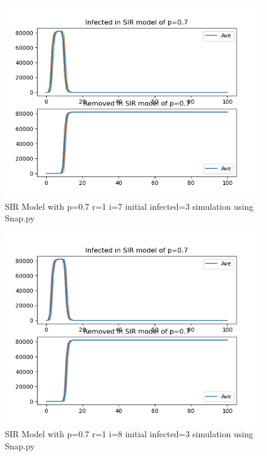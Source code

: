 \documentclass{subfile}
\begin{document}
  \begin{figure}
  \includegraphics[scale=0.8]{sirp07r1i7s3}
  \caption[SIR p=0.7,r=1,i=7,init infected=3]{SIR Model with p=0.7 r=1 i=7 initial infected=3 simulation using Snap.py}
  \end{figure}
  \begin{figure}
  \includegraphics[scale=0.8]{sirp07r1i8s3}
  \caption[SIR p=0.7,r=1,i=8,init infected=3]{SIR Model with p=0.7 r=1 i=8 initial infected=3 simulation using Snap.py}
  \end{figure}
\end{document}
